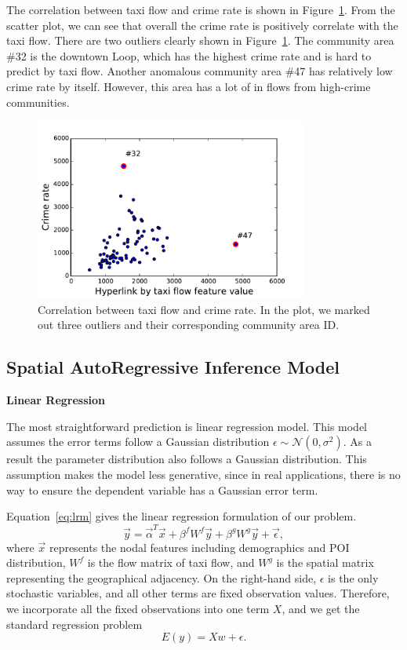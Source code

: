 The correlation between taxi flow and crime rate is shown in Figure~\ref{fig:taxi-corr}. From the scatter plot, we can see that overall the crime rate is positively correlate with the taxi flow. There are two  outliers clearly shown in Figure~\ref{fig:taxi-corr}. The community area \#32 is the downtown Loop, which has the highest crime rate and is hard to predict by taxi flow. Another anomalous community area \#47 has relatively low crime rate by itself. However, this area has a lot of in flows from high-crime communities. 




\begin{figure}[ht]
\centering
\includegraphics[width=0.8\textwidth]{fig/taxi-flow-percent.pdf}
\caption{Correlation between taxi flow and crime rate. In the plot, we marked out three outliers and their corresponding community area ID.}
\label{fig:taxi-corr}
\end{figure}






\subsection{Spatial AutoRegressive Inference Model}



\textbf{Linear Regression}

The most straightforward prediction is linear regression model. This model assumes the error terms follow a Gaussian distribution $\epsilon \sim \mathcal{N}(0, \sigma^2)$. As a result the parameter distribution also follows a Gaussian distribution. This assumption makes the model less generative, since in real applications, there is no way to ensure the dependent variable has a Gaussian error term. 


Equation~\ref{eq:lrm} gives the linear regression formulation of our problem.
\begin{equation}
\label{eq:lrm}
\vec{y} = \vec{\alpha}^T \vec{x} + \beta^f W^f \vec{y} + \beta^g W^g \vec{y} + \vec{\epsilon},
\end{equation}
where $\vec{x}$ represents the nodal features including demographics and POI distribution, $W^f$ is the flow matrix of taxi flow, and $W^g$ is the spatial matrix representing the geographical adjacency. On the right-hand side, $\epsilon$ is the only stochastic variables, and all other terms are fixed observation values. Therefore, we incorporate all the fixed observations into one term $X$, and we get the standard regression problem
\[
E(y) = X w + \epsilon.
\]


